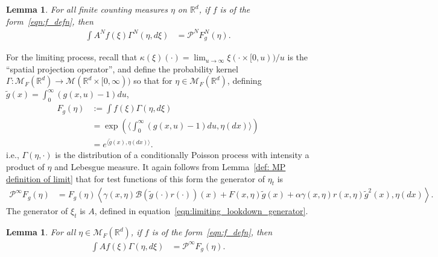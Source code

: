 \documentclass[12pt]{article}
\newtheorem{lemma}[theorem]{Lemma}
\newcommand{\IR}{\mathbb R}
\newcommand{\DG}{\mathcal{B}}  %
\newcommand{\Pgen}{\mathcal{P}}    %
\newcommand{\lp}{\xi}              %
\newcommand{\measures}{\mathcal{M}_F(\IR^d)} %
\newcommand{\flpmeasures}{\mathcal{M}(\IR^d \times [0,\infty))} %
\numberwithin{equation}{section}
\begin{document}
\begin{lemma}
    \label{lem:averaged_generators}
    For all finite counting measures $\eta$ on $\IR^d$,
    if $f$ is of the form~\eqref{eqn:f_defn}, then
    \begin{align}
        \int A^N f(\lp) \Gamma^N(\eta, d\lp)
        &=
        \Pgen^N F^N_g(\eta) .
    \end{align}
\end{lemma}

For the limiting process,
recall that $\kappa(\lp)(\cdot) = \lim_{u \to \infty} \lp(\cdot \times [0, u)) / u$
is the ``spatial projection operator'',
and define the probability kernel $\Gamma : \measures \to \flpmeasures$
so that for $\eta \in \measures$,
defining $\widetilde{g}(x) = \int_0^\infty (g(x, u) - 1) du$,
\begin{align*}
    F_g(\eta)
    &:=
    \int f(\lp) \Gamma(\eta, d\lp) \\
    &=
    \exp\left(
        \big \langle
            \int_0^\infty (g(x, u) - 1) du,
            \eta(dx)
        \big \rangle
    \right) \\
    &=
    e^{ \langle \widetilde{g}(x), \eta(dx) \rangle } .
\end{align*}
i.e., $\Gamma(\eta, \cdot)$ is the distribution of a conditionally Poisson process
with intensity a product of $\eta$ and Lebesgue measure.
It again follows from Lemma~\ref{def: MP definition of limit} that for test functions of this form
the generator of $\eta_t$ is
\begin{align} \label{eqn:pgen_infty}
    \Pgen^\infty F_g(\eta)
    &=
    F_g(\eta)
    \left\langle
        \gamma(x, \eta)
        \DG( \widetilde{g}(\cdot) r(\cdot) )(x)
        + F(x, \eta) \widetilde{g}(x)
        + \alpha \gamma(x, \eta) r(x, \eta) \widetilde{g}^2(x)
        ,
        \eta(dx)
    \right\rangle .
\end{align}
The generator of $\lp_t$ is $A$, defined in equation~\eqref{eqn:limiting_lookdown_generator}.

\begin{lemma}
    \label{lem:averaged_generators_limit}
    For all $\eta \in \measures$,
    if $f$ is of the form~\eqref{eqn:f_defn}, then
    \begin{align}
        \int A f(\lp) \Gamma(\eta, d\lp)
        &=
        \Pgen^\infty F_g(\eta) .
    \end{align}
\end{lemma}
\end{document}
